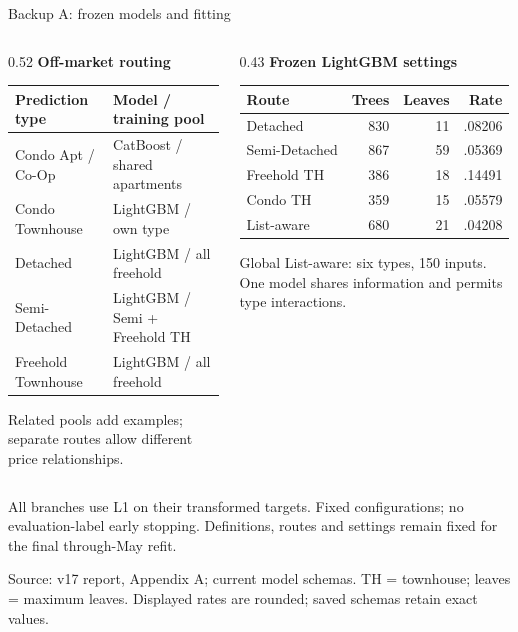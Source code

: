 \documentclass[aspectratio=169,20pt]{beamer}
\newcommand{\smalltext}{\fontsize{15}{19}\selectfont}
\newcommand{\tinytext}{\fontsize{12}{15}\selectfont}
\newcommand{\sourceline}[1]{\par{\tinytext\color{Muted}#1\par}}
\begin{document}
\begin{frame}[t]{Backup A: frozen models and fitting}
\relax
\begin{columns}[T,onlytextwidth]
\begin{column}{0.52\textwidth}
\textbf{Off-market routing}

{\fontsize{16}{20}\selectfont
\renewcommand{\arraystretch}{1.35}
\begin{tabular}{@{}p{5.2cm}p{8.5cm}@{}}
\toprule
\textbf{Prediction type} & \textbf{Model / training pool}\\
\midrule
Condo Apt / Co-Op & CatBoost / shared apartments\\
Condo Townhouse & LightGBM / own type\\
Detached & LightGBM / all freehold\\
Semi-Detached & LightGBM / Semi + Freehold TH\\
Freehold Townhouse & LightGBM / all freehold\\
\bottomrule
\end{tabular}}\par\vspace{3mm}

\smalltext Related pools add examples; separate routes allow different price relationships.
\end{column}
\begin{column}{0.43\textwidth}
\textbf{Frozen LightGBM settings}

{\fontsize{16}{20}\selectfont
\renewcommand{\arraystretch}{1.35}
\begin{tabular}{@{}lrrr@{}}
\toprule
\textbf{Route} & \textbf{Trees} & \textbf{Leaves} & Rate\\
\midrule
Detached & 830 & 11 & .08206\\
Semi-Detached & 867 & 59 & .05369\\
Freehold TH & 386 & 18 & .14491\\
Condo TH & 359 & 15 & .05579\\
List-aware & 680 & 21 & .04208\\
\bottomrule
\end{tabular}}\par\vspace{3mm}

\smalltext Global List-aware: six types, 150 inputs. One model shares information and permits type interactions.
\end{column}
\end{columns}
\vfill
{\smalltext All branches use L1 on their transformed targets. Fixed configurations; no evaluation-label early stopping. Definitions, routes and settings remain fixed for the final through-May refit.}

\sourceline{Source: v17 report, Appendix A; current model schemas. TH = townhouse; leaves = maximum leaves. Displayed rates are rounded; saved schemas retain exact values.}
\end{frame}
\end{document}
